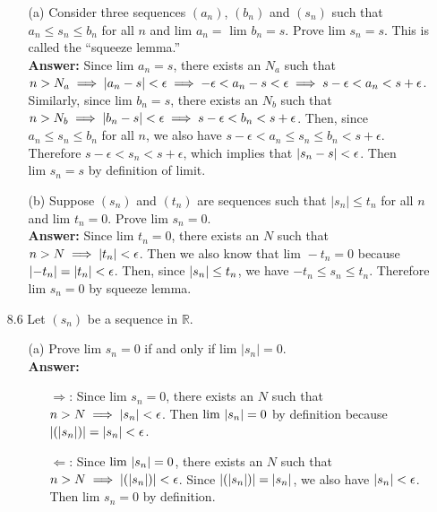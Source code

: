 \documentclass{article}
\begin{document}
\begin{itemize}
            \begin{itemize}
                  \item [(a)] Consider three sequences $(a_n)$, $(b_n)$ and $(s_n)$ such that $a_n\leq s_n\leq b_n$ for all $n$ and $\text{lim }a_n=$ $\text{lim }b_n=s$. Prove $\text{lim }s_n=s$. This is called the ``squeeze lemma.''\\
                        \textbf{Answer: } Since $\text{lim }a_n=s$, there exists an $N_a$ such that $n>N_a\implies\abs{a_n-s}<\epsilon\implies -\epsilon<a_n-s<\epsilon \implies s-\epsilon<a_n<s+\epsilon$. Similarly, since $\text{lim }b_n=s$, there exists an $N_b$ such that $n>N_b\implies\abs{b_n-s}<\epsilon\implies s-\epsilon<b_n<s+\epsilon$. Then, since $a_n\leq s_n\leq b_n$ for all $n$, we also have $s-\epsilon<a_n\leq s_n\leq b_n<s+\epsilon$. Therefore $s-\epsilon<s_n<s+\epsilon$, which implies that $\abs{s_n-s}<\epsilon$. Then $\text{lim }s_n=s$ by definition of limit.
                  \item [(b)] Suppose $(s_n)$ and $(t_n)$ are sequences such that $|s_n|\leq t_n$ for all $n$ and $\text{lim }t_n=0$. Prove $\text{lim }s_n=0$.\\
                        \textbf{Answer: } Since $\text{lim }t_n=0$, there exists an $N$ such that $n>N\implies \abs{t_n}<\epsilon$. Then we also know that $\text{lim }-t_n=0$ because $\abs{-t_n}=\abs{t_n}<\epsilon$. Then, since $\abs{s_n}\leq t_n$, we have $-t_n\leq s_n\leq t_n$. Therefore $\text{lim }s_n=0$ by squeeze lemma.
            \end{itemize}
      \item [8.6] Let $(s_n)$ be a sequence in $\mathbb{R}$.
            \begin{itemize}
                  \item [(a)] Prove $\text{lim }s_n=0$ if and only if $\text{lim }|s_n|=0$.\\
                        \textbf{Answer: }
                        \begin{itemize}
                              \item [$\Rightarrow$:] Since $\text{lim }s_n=0$, there exists an $N$ such that $n>N\implies\abs{s_n}<\epsilon$. Then $\text{lim }\abs{s_n}=0$ by definition because $\abs{(\abs{s_n})}=\abs{s_n}<\epsilon$.
                              \item [$\Leftarrow$:] Since $\text{lim }\abs{s_n}=0$, there exists an $N$ such that $n>N\implies\abs{(\abs{s_n})}<\epsilon$. Since $\abs{(\abs{s_n})}=\abs{s_n}$, we also have $\abs{s_n}<\epsilon$. Then $\text{lim }s_n=0$ by definition.

\end{itemize}
\end{itemize}
\end{itemize}
\end{document}

